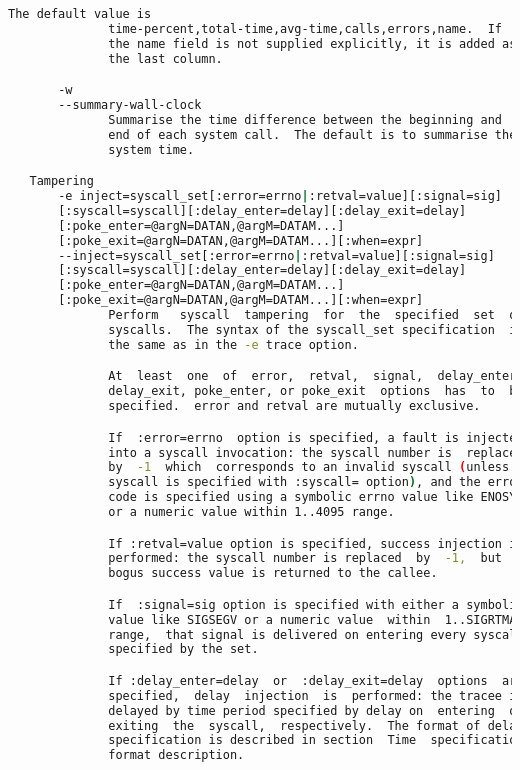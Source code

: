 {{\begin{lstlisting}[language=bash]
              The default value is
              time-percent,total-time,avg-time,calls,errors,name.  If
              the name field is not supplied explicitly, it is added as
              the last column.

       -w
       --summary-wall-clock
              Summarise the time difference between the beginning and
              end of each system call.  The default is to summarise the
              system time.

   Tampering
       -e inject=syscall_set[:error=errno|:retval=value][:signal=sig]
       [:syscall=syscall][:delay_enter=delay][:delay_exit=delay]
       [:poke_enter=@argN=DATAN,@argM=DATAM...]
       [:poke_exit=@argN=DATAN,@argM=DATAM...][:when=expr]
       --inject=syscall_set[:error=errno|:retval=value][:signal=sig]
       [:syscall=syscall][:delay_enter=delay][:delay_exit=delay]
       [:poke_enter=@argN=DATAN,@argM=DATAM...]
       [:poke_exit=@argN=DATAN,@argM=DATAM...][:when=expr]
              Perform   syscall  tampering  for  the  specified  set  of
              syscalls.  The syntax of the syscall_set specification  is
              the same as in the -e trace option.

              At  least  one  of  error,  retval,  signal,  delay_enter,
              delay_exit, poke_enter, or poke_exit  options  has  to  be
              specified.  error and retval are mutually exclusive.

              If  :error=errno  option is specified, a fault is injected
              into a syscall invocation: the syscall number is  replaced
              by  -1  which  corresponds to an invalid syscall (unless a
              syscall is specified with :syscall= option), and the error
              code is specified using a symbolic errno value like ENOSYS
              or a numeric value within 1..4095 range.

              If :retval=value option is specified, success injection is
              performed: the syscall number is replaced  by  -1,  but  a
              bogus success value is returned to the callee.

              If  :signal=sig option is specified with either a symbolic
              value like SIGSEGV or a numeric value  within  1..SIGRTMAX
              range,  that signal is delivered on entering every syscall
              specified by the set.

              If :delay_enter=delay  or  :delay_exit=delay  options  are
              specified,  delay  injection  is  performed: the tracee is
              delayed by time period specified by delay on  entering  or
              exiting  the  syscall,  respectively.  The format of delay
              specification is described in section  Time  specification
              format description.


\end{lstlisting}}}
